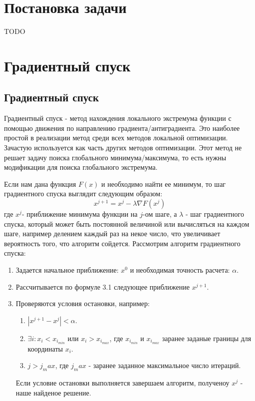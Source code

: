 \documentclass[12pt]{report}
\begin{document}
  \chapter{Постановка задачи}
  {TODO}

  \chapter{Градиентный спуск}
  \section{Градиентный спуск}

  Градиентный спуск - метод нахождения локального экстремума функции с помощью
  движения по направлению градиента/антиградиента. Это наиболее простой
  в реализации метод среди всех методов локальной оптимизации. Зачастую
  используется как часть других методов оптимизации. Этот метод не решает задачу
  поиска глобального минимума/максимума, то есть нужны модификации для поиска
  глобального экстремума.

  Если нам дана функция $F(x)$ и необходимо найти ее минимум, то шаг градиентного
  спуска выглядит следующим образом:
  \begin{equation}
    x^{j+1}=x^j- \lambda \nabla F(x^j)
  \end{equation}
  где $x^j$- приближение минимума функции на $j$-ом шаге, а $\lambda$ - шаг
  градиентного спуска, который может быть постоянной величиной или вычисляться
  на каждом шаге, например делением каждый раз на некое число, что увеличивает
  вероятность того, что алгоритм сойдется.
  Рассмотрим алгоритм градиентного спуска:
  \begin{enumerate}
    \item
    Задается начальное приближение: $x^0$ и необходимая точность расчета: $\alpha$.
    \item
    Рассчитывается по формуле 3.1 следующее приближение $x^{j+1}$.
    \item
    Проверяются условия остановки, например:
    \begin{enumerate}
      \item
      $|x^{j+1}-x^j| < \alpha$.
      \item
      $\exists i: x_i < x_{i_{min}}$ или $x_i > x_{i_{max}}$, где $x_{i_{min}}$ и $x_{i_{max}}$
      заранее заданые границы для координаты $x_i$.
      \item
      $j>j_max$, где $j_max$ - заранее заданное максимальное число итераций.
    \end{enumerate}
    Если условие остановки выполняется завершаем алгоритм, полученоу $x^j$ - наше найденое решение.
  \end{enumerate}
\end{document}
